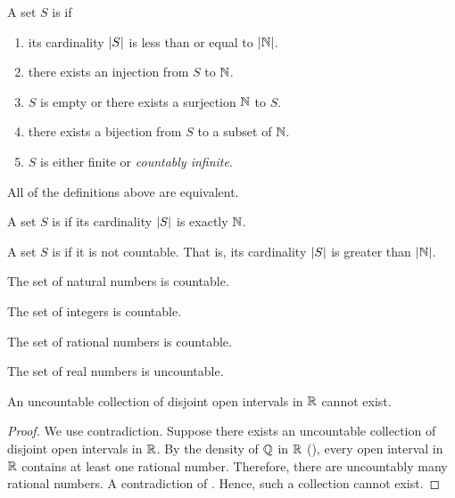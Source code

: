 \begin{definition}
  A set $S$ is  if
  \begin{enumerate}
    \item its cardinality $| S |$ is less than or equal to $| \mathbb N |$.
    \item there exists an injection from $S$ to $\NN$.
    \item $S$ is empty or there exists a surjection $\NN$ to $S$.
    \item there exists a bijection from $S$ to a subset of $\NN$.
    \item $S$ is either finite or \textit{countably infinite}.
  \end{enumerate}
  All of the definitions above are equivalent.

  A set $S$ is  if its cardinality
  $| S |$ is exactly $\NN$.

  A set $S$ is  if it is not countable. That is,
  its cardinality $| S |$ is greater than $| \mathbb N |$.
\end{definition}

\begin{corollary}[$\NN$ is countable]
  The set of natural numbers is countable.
\end{corollary}

\begin{corollary}[$\ZZ$ is countable]
  The set of integers is countable.
\end{corollary}

\begin{corollary}[$\QQ$ is countable]
  The set of rational numbers is countable.
\end{corollary}

\begin{corollary}[$\RR$ is uncountable]
  The set of real numbers is uncountable.
\end{corollary}

\begin{theorem}
  An uncountable collection of disjoint open intervals in $\RR$ cannot exist.
\end{theorem}

\begin{proof}
  We use contradiction. Suppose there exists an uncountable
  collection of disjoint open intervals in $\RR$. By the density of
  $\QQ$ in $\RR$ (), every open interval in
  $\RR$ contains at least one rational number. Therefore, there are
  uncountably many rational numbers. A contradiction of
  . Hence, such a collection cannot exist.
\end{proof}

